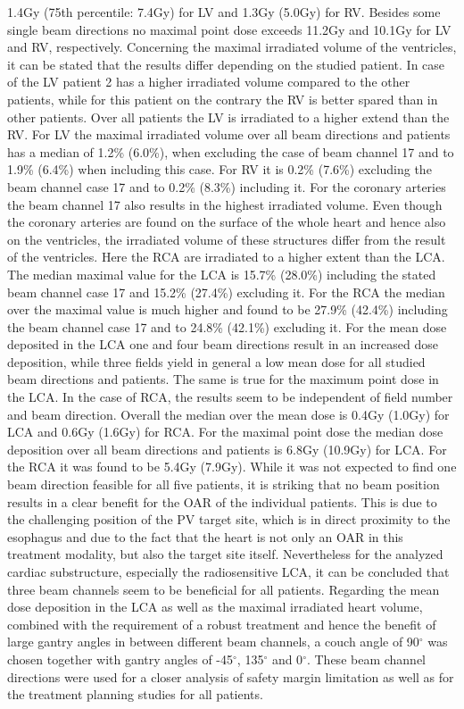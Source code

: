 1.4Gy (75th percentile: 7.4Gy) for LV and 1.3Gy (5.0Gy) for RV. Besides some single beam directions no maximal point dose exceeds 11.2Gy and 10.1Gy 
for LV and RV, respectively. Concerning the maximal irradiated volume of the ventricles, it can be stated that the results differ depending on 
the studied patient. In case of the LV patient 2 has a higher irradiated volume compared to the other patients, while for this patient on the 
contrary the RV is better spared than in other patients. Over all patients the LV is irradiated to a higher extend than the RV. For LV the maximal 
irradiated volume over all beam directions and patients has a median of 1.2\% (6.0\%), when excluding the case of beam channel 17 and to 
1.9\% (6.4\%) when including this case. For RV it is 0.2\% (7.6\%) excluding the beam channel case 17 and to 0.2\% (8.3\%) including it.
For the coronary arteries the beam channel 17 also results in the highest irradiated volume. 
Even though the coronary arteries are found on the surface of the whole heart and hence also on the ventricles, the irradiated volume of 
these structures differ from the result of the ventricles. Here the RCA are irradiated to a higher extent than the LCA. 
The median maximal value for the LCA is 15.7\% (28.0\%) including the stated beam channel case 17 and 15.2\% 
(27.4\%) excluding it. For the RCA the median over the maximal value is much higher and found to be 27.9\% (42.4\%) including the beam channel 
case 17 and to 24.8\% (42.1\%) excluding it. For the mean dose deposited in the LCA one and four beam directions result in an increased dose 
deposition, while three fields yield in general a low mean dose for all studied beam directions and patients. The same is true for the maximum 
point dose in the LCA. In the case of RCA, the results seem to be independent of field number and beam direction. Overall the median over the 
mean dose is 0.4Gy (1.0Gy) for LCA and 0.6Gy (1.6Gy) for RCA. For the maximal point dose the median dose deposition over all beam directions 
and patients is 6.8Gy (10.9Gy) for LCA. For the RCA it was found to be 5.4Gy (7.9Gy). \newline
\newline
While it was not expected to find one beam direction feasible for all five patients, it is striking that no beam position results in a clear 
benefit for the OAR of the individual patients. This is due to the challenging position of the PV target site, which is in direct proximity 
to the esophagus and due to the fact that the heart is not only an OAR in this treatment modality, but also the target site itself. 
Nevertheless for the analyzed cardiac substructure, especially the radiosensitive LCA, it can be concluded that three beam channels seem to be 
beneficial for all patients. Regarding the mean dose deposition in the LCA as well as the maximal irradiated heart volume, combined with the 
requirement of a robust treatment and hence the benefit of large gantry angles in between different beam channels, a couch angle of 
90$^{\circ}$ was chosen together with gantry angles of -45$^{\circ}$, 135$^{\circ}$ and 0$^{\circ}$. These beam channel directions were used 
for a closer analysis of safety margin limitation as well as for the treatment planning studies for all patients. 

